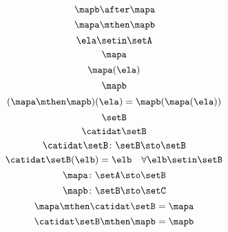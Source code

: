 {\begin{forslides}
    \begin{equation}
        \label{eq:slides_session2_134}
        \mapb \after \mapa
    \end{equation}
    \begin{equation}
        \label{eq:slides_session2_135}
        \mapa \mthen \mapb
    \end{equation}
    \begin{equation}
        \label{eq:slides_session2_136}
        \ela \setin\setA
    \end{equation}
    \begin{equation}
        \label{eq:slides_session2_137}
        \mapa
    \end{equation}
    \begin{equation}
        \label{eq:slides_session2_138}
        \mapa(\ela)
    \end{equation}
    \begin{equation}
        \label{eq:slides_session2_139}
        \mapb
    \end{equation}
    \begin{equation}
        \label{eq:slides_session2_140}
        (\mapa \mthen \mapb)(\ela) = \mapb(\mapa(\ela))
    \end{equation}
    \begin{equation}
        \label{eq:slides_session2_141}
        \setB
    \end{equation}
    \begin{equation}
        \label{eq:slides_session2_142}
        \catidat\setB
    \end{equation}
    \begin{equation}
        \label{eq:slides_session2_142a}
        \catidat\setB \colon \setB \sto \setB
    \end{equation}
    \begin{equation}
        \label{eq:slides_session2_143}
        \catidat\setB(\elb) = \elb \quad \forall  \elb \setin\setB
    \end{equation}
    \begin{equation}
        \label{eq:slides_session2_144}
        \mapa \colon \setA \sto \setB
    \end{equation}
    \begin{equation}
        \label{eq:slides_session2_145}
        \mapb \colon \setB \sto \setC
    \end{equation}
    \begin{equation}
        \label{eq:slides_session2_146}
        \mapa \mthen \catidat\setB = \mapa
    \end{equation}
    \begin{equation}
        \label{eq:slides_session2_147}
        \catidat\setB \mthen \mapb = \mapb
    \end{equation}


\end{forslides}}
